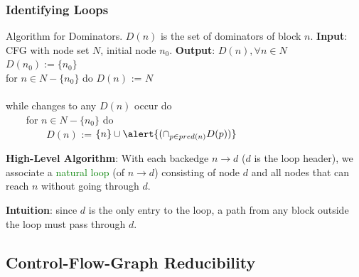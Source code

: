 \documentclass{beamer}
\newcommand{\green}[1]{\textcolor{Green}{{#1}}}
\newcommand{\emp}[1]{\textcolor{DikuRed}{ #1}}
\begin{document}
\begin{frame}[fragile,t]
    \frametitle{Identifying Loops}

\bigskip

\begin{block}{Algorithm for Dominators. $D(n)$ is the set of dominators of block $n$.}
{\bf Input}: \textsc{CFG} with node set $N$, initial node $n_0$.
{\bf Output}: $D(n), \forall n \in N$\\
$D(n_0) := \{ n_0 \}$\\
for $n \in N - \{n_0\}$ do $D(n)$ := $N$\\
{\tt~~}\\
while changes to any $D(n)$ occur do\\
{\tt~~~~}for $n \in N - \{n_0\}$ do\\
{\tt~~~~~~~~}$D(n)$ := $\{n\} \cup \alert{(\cap_{p\in pred(n)} D(p))}$
\end{block}

\pause
\bigskip

{\bf High-Level Algorithm}: With each \emp{backedge $n \rightarrow d$}
($d$ is the loop header), we associate a \green{natural loop} (of $n \rightarrow d$) 
consisting of node $d$ and all nodes that can reach $n$ without going through $d$.

\bigskip

{\bf Intuition}: since $d$ is the only entry to the loop, a path from any
block outside the loop must pass through $d$.

\end{frame}


\subsection{Control-Flow-Graph Reducibility}
\end{document}
